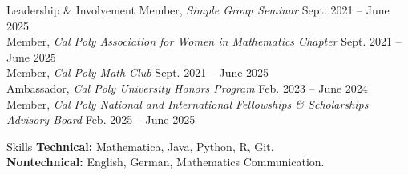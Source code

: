 \documentclass[
	11pt, %
]{cv} %
\begin{document}

\begin{rSection}{Leadership \& Involvement}
	Member, \textit{Simple Group Seminar} \dotfill Sept. 2021 -- June 2025 \\
	Member, \textit{Cal Poly Association for Women in Mathematics Chapter} \dotfill Sept. 2021 -- June 2025 \\
	Member, \textit{Cal Poly Math Club} \dotfill Sept. 2021 -- June 2025 \\
	Ambassador, \textit{Cal Poly University Honors Program} \dotfill Feb. 2023 -- June 2024 \\
	Member, \textit{Cal Poly National and International Fellowships \& Scholarships Advisory Board} \dotfill Feb. 2025 -- June 2025 
\end{rSection}

\begin{rSection}{Skills}
	\textbf{Technical: } Mathematica, Java, Python, R, Git.\\
	\textbf{Nontechnical: } English, German, Mathematics Communication.
\end{rSection}
\end{document}

